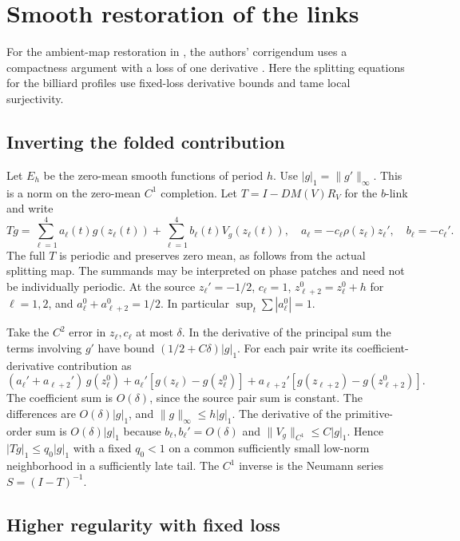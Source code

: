 \documentclass[11pt]{article}
\begin{document}
\section{Smooth restoration of the links}\label{sec:restoration}

For the ambient-map restoration in \cite[\S5]{BT}, the authors' corrigendum uses
a compactness argument with a loss of one derivative \cite{BTcorr}. Here the
splitting equations for the billiard profiles use fixed-loss derivative bounds
and tame local surjectivity.

\subsection{Inverting the folded
contribution}\label{inverting-the-folded-contribution}

Let \(E_h\) be the zero-mean smooth functions of period \(h\). Use
\(|g|_1=\|g'\|_\infty\). This is a norm on the zero-mean \(C^1\) completion. Let
\(T=I-DM(V)R_V\) for the \(b\)-link and write \[
 Tg=\sum_{\ell=1}^4 a_\ell(t)g(z_\ell(t))
      +\sum_{\ell=1}^4 b_\ell(t)V_g(z_\ell(t)),\quad
 a_\ell=-c_\ell\rho(z_\ell)z_\ell',\quad b_\ell=-c_\ell'.
\] The full \(T\) is periodic and preserves zero mean, as follows from the
actual splitting map. The summands may be interpreted on phase patches and need
not be individually periodic. At the source \(z_\ell'= -1/2\), \(c_\ell=1\),
\(z_{\ell+2}^0=z_\ell^0+h\) for \(\ell=1,2\), and \(a_\ell^0+a_{\ell+2}^0=1/2\).
In particular \(\sup_t\sum |a_\ell^0|=1\).

Take the \(C^2\) error in \(z_\ell,c_\ell\) at most \(\delta\). In the
derivative of the principal sum the terms involving \(g'\) have bound
\((1/2+C\delta)|g|_1\). For each pair write its coefficient-derivative
contribution as \[
 (a_\ell'+a_{\ell+2}')\,g(z_\ell^0)
 + a_\ell'[g(z_\ell)-g(z_\ell^0)]
 + a_{\ell+2}'[g(z_{\ell+2})-g(z_{\ell+2}^0)].
\] The coefficient sum is \(O(\delta)\), since the source pair sum is constant.
The differences are \(O(\delta)|g|_1\), and \(\|g\|_\infty\le h|g|_1\). The
derivative of the primitive-order sum is \(O(\delta)|g|_1\) because
\(b_\ell,b_\ell'=O(\delta)\) and \(\|V_g\|_{C^1}\le C|g|_1\). Hence
\(|Tg|_1\le q_0|g|_1\) with a fixed \(q_0<1\) on a common sufficiently small
low-norm neighborhood in a sufficiently late tail. The \(C^1\) inverse is the
Neumann series \(S=(I-T)^{-1}\).

\subsection{Higher regularity with fixed
loss}\label{higher-regularity-with-fixed-loss}
\end{document}

